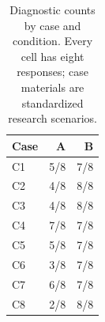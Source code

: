 \begin{table}[t]
\centering
\small
\caption{Diagnostic counts by case and condition. Every cell has eight responses; case materials are standardized research scenarios.}
\label{tab:human-study-keycases}
\begin{tabular}{lrr}
\toprule
Case & A & B \\
\midrule
C1 & 5/8 & 7/8 \\
C2 & 4/8 & 8/8 \\
C3 & 4/8 & 8/8 \\
C4 & 7/8 & 7/8 \\
C5 & 5/8 & 7/8 \\
C6 & 3/8 & 7/8 \\
C7 & 6/8 & 7/8 \\
C8 & 2/8 & 8/8 \\
\bottomrule
\end{tabular}
\end{table}
